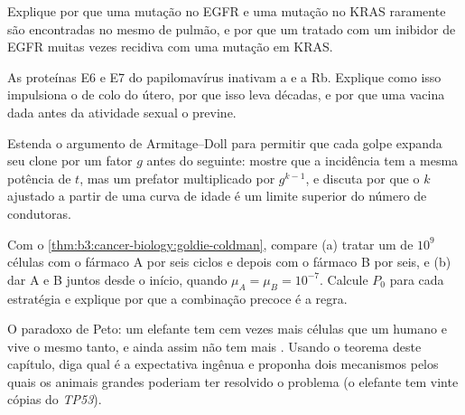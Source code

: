 \begin{exercise}[$\star\star$]\label{exo:b3:cancer-biology:8}
Explique por que uma mutação no EGFR e uma mutação no KRAS raramente
são encontradas no mesmo  de pulmão, e por que um  tratado
com um inibidor de EGFR muitas vezes recidiva com uma mutação em KRAS.
\end{exercise}

\begin{exercise}[$\star\star$]\label{exo:b3:cancer-biology:9}
As proteínas E6 e E7 do papilomavírus inativam a  e a Rb. Explique
como isso impulsiona o  de colo do útero, por que isso leva
décadas, e por que uma vacina dada antes da atividade sexual o previne.
\end{exercise}

\begin{exercise}[$\star\star\star$]\label{exo:b3:cancer-biology:10}
Estenda o argumento de Armitage--Doll para permitir que cada golpe
expanda seu clone por um fator $g$ antes do seguinte: mostre que a
incidência tem a mesma potência de $t$, mas um prefator multiplicado
por $g^{k-1}$, e discuta por que o $k$ ajustado a partir de uma curva
de idade é um limite superior do número de condutoras.
\end{exercise}

\begin{exercise}[$\star\star\star$]\label{exo:b3:cancer-biology:11}
Com o \cref{thm:b3:cancer-biology:goldie-coldman}, compare (a) tratar um
 de $10^{9}$ células com o fármaco A por seis ciclos e depois com
o fármaco B por seis, e (b) dar A e B juntos desde o início, quando
$\mu_{A} =
\mu_{B} = 10^{-7}$. Calcule $P_{0}$ para cada estratégia e
explique por que a combinação precoce é a regra.
\end{exercise}

\begin{exercise}[$\star\star\star$]\label{exo:b3:cancer-biology:12}
O paradoxo de Peto: um elefante tem cem vezes mais células que um
humano e vive o mesmo tanto, e ainda assim não tem mais . Usando
o teorema deste capítulo, diga qual é a expectativa ingênua e proponha
dois mecanismos pelos quais os animais grandes poderiam ter resolvido o
problema (o elefante tem vinte cópias do \emph{TP53}).
\end{exercise}


